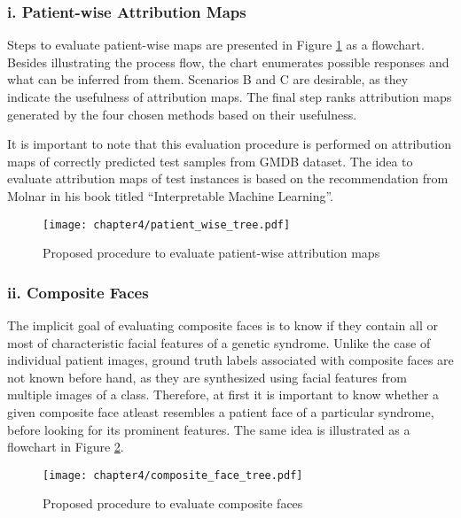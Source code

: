 \documentclass[../report.tex]{subfiles}
\begin{document}
    \subsubsection{i. Patient-wise Attribution Maps}
    Steps to evaluate patient-wise maps are presented in Figure \ref{fig_patient_flow} as a flowchart. Besides illustrating the process flow, the chart enumerates possible responses and what can be inferred from them. Scenarios B and C are desirable, as they indicate the usefulness of attribution maps. The final step ranks attribution maps generated by the four chosen methods based on their usefulness.
    
    It is important to note that this evaluation procedure is performed on attribution maps of correctly predicted test samples from GMDB dataset. The idea to evaluate attribution maps of test instances is based on the recommendation from Molnar in his book titled \enquote{Interpretable Machine Learning}\cite{molnar2019}.
    
     \begin{figure}[H]
     	\hspace*{1cm}    
    	\texttt{[image: chapter4/patient\_wise\_tree.pdf]}
    	\vspace*{1cm}
   	    \caption{Proposed procedure to evaluate patient-wise attribution maps}
		\label{fig_patient_flow}
    \end{figure}

	\subsubsection{ii. Composite Faces}
	The implicit goal of evaluating composite faces is to know if they contain all or most of characteristic facial features of a genetic syndrome. Unlike the case of individual patient images, ground truth labels associated with composite faces are not known before hand, as they are synthesized using facial features from multiple images of a class. Therefore, at first it is important to know whether a given composite face atleast resembles a patient face of a particular syndrome, before looking for its prominent features. The same idea is illustrated as a flowchart in Figure \ref{fig_composite_flow}. 
	
	\begin{figure}[H]
		\hspace*{1cm}      
		\texttt{[image: chapter4/composite\_face\_tree.pdf]}
		\vspace*{5cm}
		\caption{Proposed procedure to evaluate composite faces}
		\label{fig_composite_flow}	
	\end{figure}
\end{document}
